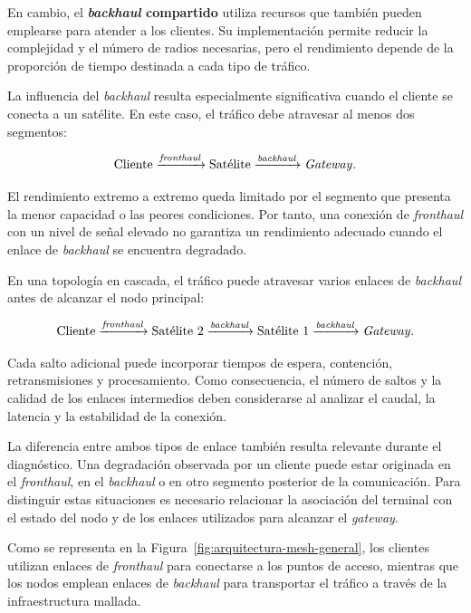 En cambio, el \textbf{\textit{backhaul} compartido} utiliza recursos que
también pueden emplearse para atender a los clientes. Su implementación
permite reducir la complejidad y el número de radios necesarias, pero el
rendimiento depende de la proporción de tiempo destinada a cada tipo de
tráfico.

La influencia del \textit{backhaul} resulta especialmente significativa
cuando el cliente se conecta a un satélite. En este caso, el tráfico debe
atravesar al menos dos segmentos:

\[
    \text{Cliente}
    \xrightarrow{\text{\textit{fronthaul}}}
    \text{Satélite}
    \xrightarrow{\text{\textit{backhaul}}}
    \text{\textit{Gateway}}.
\]

El rendimiento extremo a extremo queda limitado por el segmento que
presenta la menor capacidad o las peores condiciones. Por tanto, una
conexión de \textit{fronthaul} con un nivel de señal elevado no garantiza
un rendimiento adecuado cuando el enlace de \textit{backhaul} se
encuentra degradado.

En una topología en cascada, el tráfico puede atravesar varios enlaces de
\textit{backhaul} antes de alcanzar el nodo principal:

\[
    \text{Cliente}
    \xrightarrow{\text{\textit{fronthaul}}}
    \text{Satélite 2}
    \xrightarrow{\text{\textit{backhaul}}}
    \text{Satélite 1}
    \xrightarrow{\text{\textit{backhaul}}}
    \text{\textit{Gateway}}.
\]

Cada salto adicional puede incorporar tiempos de espera, contención,
retransmisiones y procesamiento. Como consecuencia, el número de saltos
y la calidad de los enlaces intermedios deben considerarse al analizar
el caudal, la latencia y la estabilidad de la conexión.

La diferencia entre ambos tipos de enlace también resulta relevante
durante el diagnóstico. Una degradación observada por un cliente puede
estar originada en el \textit{fronthaul}, en el \textit{backhaul} o en
otro segmento posterior de la comunicación. Para distinguir estas
situaciones es necesario relacionar la asociación del terminal con el
estado del nodo y de los enlaces utilizados para alcanzar el
\textit{gateway}.

Como se representa en la
Figura~\ref{fig:arquitectura-mesh-general}, los clientes utilizan enlaces
de \textit{fronthaul} para conectarse a los puntos de acceso, mientras
que los nodos emplean enlaces de \textit{backhaul} para transportar el
tráfico a través de la infraestructura mallada.

